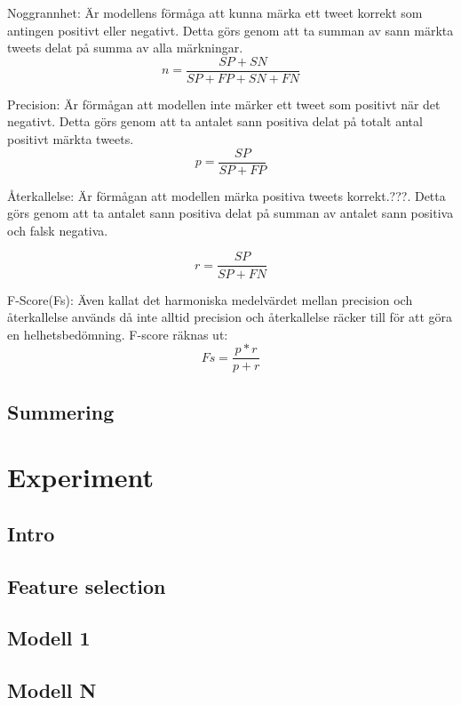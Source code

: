 \documentclass{kaumasters} %
\begin{document}
Noggrannhet: Är modellens förmåga att kunna märka ett tweet korrekt som antingen positivt eller negativt. Detta görs genom att ta summan av sann märkta tweets delat på summa av alla märkningar.
\begin{equation}
n = \frac{SP + SN}{SP + FP + SN + FN}
\end{equation}

Precision: Är förmågan att modellen inte märker ett tweet som positivt när det negativt. Detta görs genom att ta antalet sann positiva delat på totalt antal positivt märkta tweets. 
\begin{equation}
p = \frac{SP}{SP + FP}
\end{equation}

Återkallelse: Är förmågan att modellen märka positiva tweets korrekt.???. Detta görs genom att ta antalet sann positiva delat på summan av antalet sann positiva och falsk negativa.

\begin{equation}
r = \frac{SP}{SP + FN}
\end{equation}

F-Score(Fs): Även kallat det harmoniska medelvärdet mellan precision och återkallelse används då inte alltid precision och återkallelse räcker till för att göra en helhetsbedömning. F-score räknas ut:
\begin{equation}
Fs = \frac{p * r}{p + r}
\end{equation}


\section{Summering}

\newpage

\chapter{Experiment}
\section{Intro}
\section{Feature selection}
\section{Modell 1}
\section{Modell N}
\end{document}
